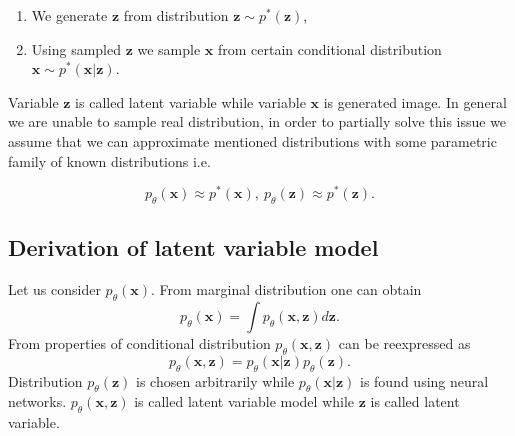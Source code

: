 \documentclass[10pt]{article}
\begin{document}
\begin{enumerate}
\item We generate $\textbf{z}$ from distribution  $\textbf{z} \sim p^{*}(\textbf{z})$,
\item Using sampled $\textbf{z}$ we sample $\textbf{x}$ from certain conditional distribution  $\textbf{x}\sim p^{*}(\textbf{x}|\textbf{z})$.
\end{enumerate}
Variable $\textbf{z}$ is called latent variable while variable $\textbf{x}$ is generated image. In general we are unable to sample real distribution, in order to partially solve this issue we assume that we can approximate mentioned distributions
with some parametric family of known distributions i.e.

\begin{equation}
p_{\theta}(\textbf{x})  \approx   p^{*}(\textbf{x}) , \
p_{\theta}(\textbf{z}) \approx   p^{*}(\textbf{z}).
\end{equation}

\subsection{Derivation of latent variable model}
Let us consider $p_{\theta}(\textbf{x})$. From marginal distribution one can obtain
\begin{equation}\label{eq:intractable}
p_{\theta}(\textbf{x}) = \int p_{\theta}(\textbf{x}, \textbf{z})d\textbf{z}.
\end{equation}
From properties of conditional distribution $p_{\theta}(\textbf{x}, \textbf{z})$ can be reexpressed as
\begin{equation}
p_{\theta}(\textbf{x}, \textbf{z}) = p_{\theta}(\textbf{x}| \textbf{z})p_{\theta}(\textbf{z}).
\end{equation}
Distribution $p_{\theta}(\textbf{z})$ is chosen arbitrarily while $p_{\theta}(\textbf{x}| \textbf{z})$ 
is found using neural networks. $p_{\theta}(\textbf{x}, \textbf{z})$ is called latent variable model while $\textbf{z}$ is called latent variable.
\end{document}
